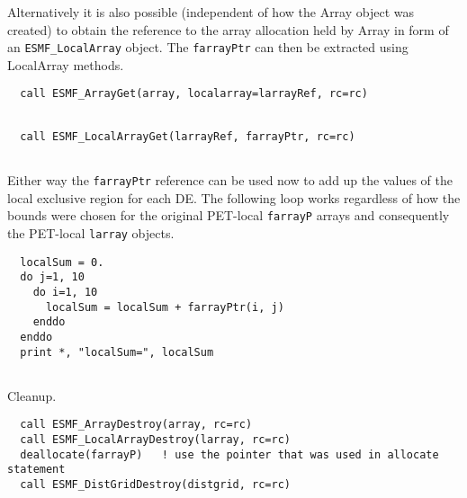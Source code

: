 
   Alternatively it is also possible (independent of how the Array object was
   created) to obtain the reference to the array allocation held by Array in 
   form of an {\tt ESMF\_LocalArray} object. The {\tt farrayPtr} can then be
   extracted using LocalArray methods. 

 \begin{verbatim}
  call ESMF_ArrayGet(array, localarray=larrayRef, rc=rc)
 
\end{verbatim}
 

 \begin{verbatim}
  call ESMF_LocalArrayGet(larrayRef, farrayPtr, rc=rc)
 
\end{verbatim}
 

   Either way the {\tt farrayPtr} reference can be used now to add up the values
   of the local exclusive region for each DE. The following loop 
   works regardless of how the bounds were chosen for the original PET-local 
   {\tt farrayP} arrays and consequently the PET-local {\tt larray} objects. 

 \begin{verbatim}
  localSum = 0.
  do j=1, 10
    do i=1, 10
      localSum = localSum + farrayPtr(i, j)
    enddo
  enddo
  print *, "localSum=", localSum
 
\end{verbatim}
 

   Cleanup. 

 \begin{verbatim}
  call ESMF_ArrayDestroy(array, rc=rc)
  call ESMF_LocalArrayDestroy(larray, rc=rc)
  deallocate(farrayP)   ! use the pointer that was used in allocate statement
  call ESMF_DistGridDestroy(distgrid, rc=rc)
 
\end{verbatim}
 

